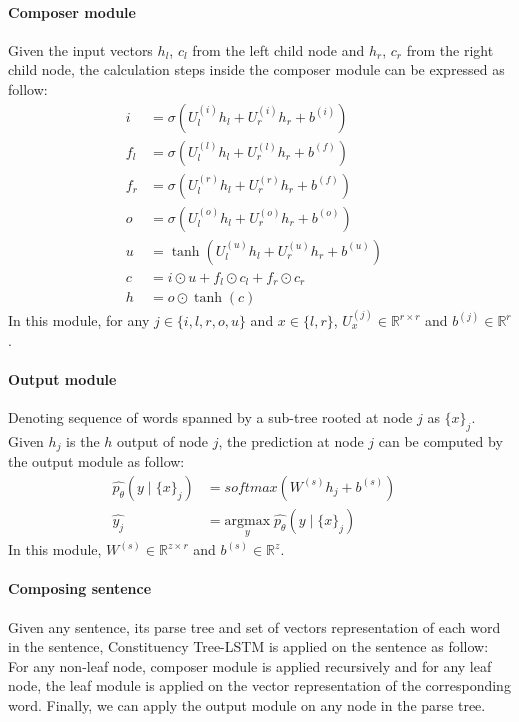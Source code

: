 \paragraph{Composer module}
Given the input vectors \({h_l}\), \({c_l}\) from the left child node and \({h_r}\), \({c_r}\) from the right child node, the calculation steps inside the composer module can be expressed as follow:
\begin{align}
i &= \sigma{ \left(U_l^{(i)} h_{l} + U_r^{(i)} h_{r} + b^{(i)} \right) } &\\
f_{l} &= \sigma{\left(U_{l}^{(l)} h_{l} + U_{r}^{(l)} h_{r} + b^{(f)}\right)} & \\
f_{r} &= \sigma{\left(U_{l}^{(r)} h_{l} + U_{r}^{(r)} h_{r} + b^{(f)}\right)} & \\
o &= \sigma{\left( U_l^{(o)} h_{l} + U_r^{(o)} h_{r} + b^{(o)}\right)} &\\
u &= \tanh{\left( U_l^{(u)} h_{l} + U_r^{(u)} h_{r} + b^{(u)}\right)} &\\
c &= i \odot u + f_{l} \odot c_{l} + f_{r} \odot c_{r} & \\
h &= o \odot \tanh{\left(c\right)} &
\end{align}
In this module, for any \(j \in \{i, l, r, o, u\}\) and \(x \in \{l, r\}\), \(U_x^{(j)} \in \mathbb{R}^{r \times r}\) and \( b^{(j)} \in \mathbb{R}^r\).
\paragraph{Output module}
Denoting sequence of words spanned by a sub-tree rooted at node \({j}\) as \({\{x\}_j}\).
Given \({h_j}\) is the \({h}\) output of node \({j}\), the prediction at node \({j}\) can be computed by the output module as follow:
\begin{align}
\hat{p_{\theta}}(y \mid \{x\}_j ) &= softmax( W^{(s)} h_j + b^{(s)}) & \\
\hat{y_j} &= \underset{y}{\mathrm{argmax}} \; \hat{p_{\theta}}(y \mid \{x\}_j ) &
\end{align}
In this module, \(W^{(s)} \in \mathbb{R}^{z \times r}\) and \( b^{(s)} \in \mathbb{R}^z\).
\paragraph{Composing sentence}
Given any sentence, its parse tree and set of vectors representation of each word in the sentence, Constituency Tree-LSTM is applied on the sentence as follow:
For any non-leaf node, composer module is applied recursively and for any leaf node, the leaf module is applied on the vector representation of the corresponding word.
Finally, we can apply the output module on any node in the parse tree.

